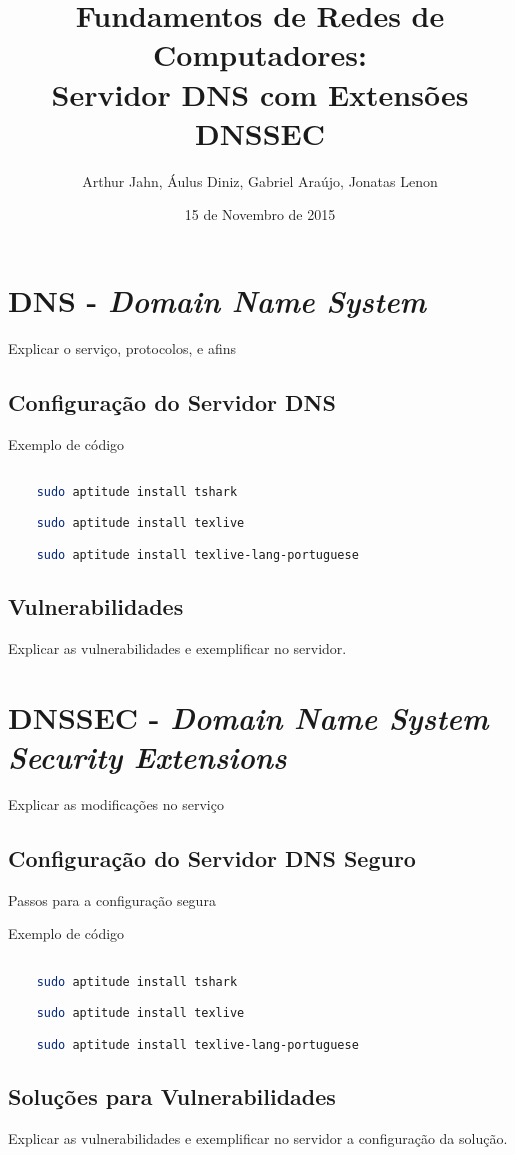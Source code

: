 \documentclass[a4paper]{report} %
\title{Fundamentos de Redes de Computadores: \\ Servidor DNS com Extensões DNSSEC}
\author{Arthur Jahn, Áulus Diniz, Gabriel Araújo, Jonatas Lenon}
\date{15 de Novembro de 2015}    %
\begin{document}
\maketitle  %

\tableofcontents %
\chapter{ DNS  - \textit{Domain Name System}}
\label{chap_dns}

Explicar o serviço, protocolos, e afins

\section{Configuração do Servidor DNS}
\label{sec_configuracao}

Exemplo de código
\begin{lstlisting}[language=bash]

	sudo aptitude install tshark

	sudo aptitude install texlive

	sudo aptitude install texlive-lang-portuguese

\end{lstlisting}

\section{Vulnerabilidades }
\label{sec_vulnerabilidades}

Explicar as vulnerabilidades e exemplificar no servidor.

\chapter{ DNSSEC  - \textit{Domain Name System Security Extensions}}
\label{chap_dnssec}

Explicar as modificações no serviço

\section{Configuração do Servidor DNS Seguro}
\label{sec_config_segura}

Passos para a configuração segura

Exemplo de código
\begin{lstlisting}[language=bash]

	sudo aptitude install tshark

	sudo aptitude install texlive

	sudo aptitude install texlive-lang-portuguese

\end{lstlisting}

\section{Soluções para Vulnerabilidades }
\label{sec_solucoes}

Explicar as vulnerabilidades e exemplificar no servidor a configuração da solução.


\begin{thebibliography}{99}
\end{thebibliography}

\end{document}
